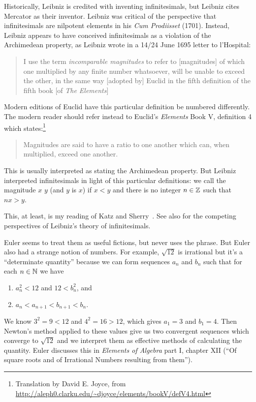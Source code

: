 Historically, Leibniz is credited with inventing infinitesimals, but
Leibniz cites Mercator as their inventor. Leibniz was critical of the
perspective that infinitesimals are nilpotent elements in his
\textit{Cum Prodiisset} (1701). Instead, Leibniz appears to have
conceived infinitesimals as a violation of the Archimedean property, as
Leibniz wrote in a 14/24 June 1695 letter to l'Hospital:
\begin{quote}
I use the term \emph{incomparable magnitudes} to refer to [magnitudes]
of which one multiplied by any finite number whatsoever, will be
unable to exceed the other, in the same way [adopted by] Euclid
in the fifth definition of the fifth book [of \textit{The Elements}]
\end{quote}
Modern editions of Euclid have this particular definition be numbered
differently. The modern reader should refer instead to Euclid's \textit{Elements} Book V, definition 4
which states:\footnote{Translation by David E. Joyce, from \url{http://aleph0.clarku.edu/~djoyce/elements/bookV/defV4.html}}
\begin{quote}
Magnitudes are said to have a ratio to one another which can, when multiplied, exceed one another.
\end{quote}
This is usually interpreted as stating the Archimedean property. But
Leibniz interpreted infinitesimals in light of this particular
definitions: we call the magnitude $x$  $y$ (and
$y$ is  $x$) if $x < y$ and
there is no integer $n\in\mathbb{Z}$ such that $nx > y$.

This, at least, is my reading of Katz and
Sherry~\cite{katz2012:leibniz}. See also 
for the competing perspectives of Leibniz's theory of infinitesimals.

\M
Euler seems to treat them as useful fictions, but never uses the
phrase. But Euler also had a strange notion of numbers. For example,
$\sqrt{12}$ is irrational but it's a ``determinate quantity'' because we
can form sequences $a_{n}$ and $b_{n}$ such that for each $n\in\mathbb{N}$ we have
\begin{enumerate}
\item $a_{n}^{2}<12$ and $12 < b_{n}^{2}$, and
\item $a_{n} < a_{n + 1} < b_{n+1} < b_{n}$.
\end{enumerate}
We know $3^{2}=9<12$ and $4^{2}=16 > 12$, which gives $a_{1}=3$ and $b_{1}=4$.
Then Newton's method applied to these values give us two convergent
sequences which converge to $\sqrt{12}$ and we interpret them as
effective methods of calculating the quantity.
Euler discusses this in \textit{Elements of Algebra} part I, chapter XII
(``Of square roots and of Irrational Numbers resulting from them'').